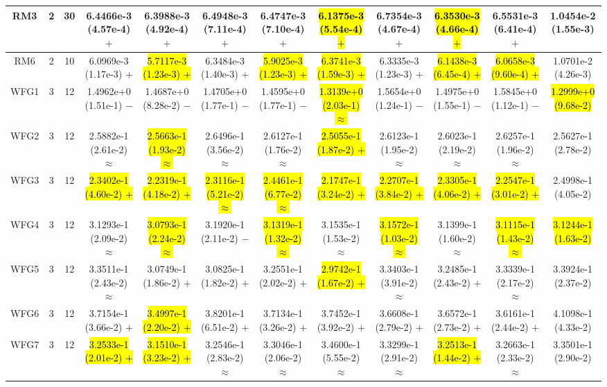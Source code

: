 \documentclass[journal]{IEEEtran}
\begin{document}
\begin{table*}[htbp]
\begin{tabular}{cccccccccccc}
\hline
\multirow{1}{*}{RM3}&2&30&6.4466e-3 (4.57e-4) $+$&6.3988e-3 (4.92e-4) $+$&6.4948e-3 (7.11e-4) $+$&6.4747e-3 (7.10e-4) $+$&\hl{6.1375e-3 (5.54e-4) $+$}&6.7354e-3 (4.67e-4) $+$&\hl{6.3530e-3 (4.66e-4) $+$}&6.5531e-3 (6.41e-4) $+$&1.0454e-2 (1.55e-3)\\
\hline
\multirow{1}{*}{RM6}&2&10&6.0969e-3 (1.17e-3) $+$&\hl{5.7117e-3 (1.23e-3) $+$}&6.3484e-3 (1.40e-3) $+$&\hl{5.9025e-3 (1.23e-3) $+$}&\hl{6.3741e-3 (1.59e-3) $+$}&6.3335e-3 (1.23e-3) $+$&\hl{6.1438e-3 (6.45e-4) $+$}&\hl{6.0658e-3 (9.60e-4) $+$}&1.0701e-2 (4.26e-3)\\
\hline
\multirow{1}{*}{WFG1}&3&12&1.4962e+0 (1.51e-1) $-$&1.4687e+0 (8.28e-2) $-$&1.4705e+0 (1.77e-1) $-$&1.4595e+0 (1.77e-1) $-$&\hl{1.3139e+0 (2.03e-1) $\approx$}&1.5654e+0 (1.24e-1) $-$&1.4975e+0 (1.55e-1) $-$&1.5845e+0 (1.12e-1) $-$&\hl{1.2999e+0 (9.68e-2)}\\
\hline
\multirow{1}{*}{WFG2}&3&12&2.5882e-1 (2.61e-2) $\approx$&\hl{2.5663e-1 (1.93e-2) $\approx$}&2.6496e-1 (3.56e-2) $\approx$&2.6127e-1 (1.76e-2) $\approx$&\hl{2.5055e-1 (1.87e-2) $+$}&2.6123e-1 (1.95e-2) $\approx$&2.6023e-1 (2.19e-2) $\approx$&2.6257e-1 (1.96e-2) $\approx$&2.5627e-1 (2.78e-2)\\
\hline
\multirow{1}{*}{WFG3}&3&12&\hl{2.3402e-1 (4.60e-2) $+$}&\hl{2.2319e-1 (4.18e-2) $+$}&\hl{2.3116e-1 (5.21e-2) $\approx$}&\hl{2.4461e-1 (6.77e-2) $\approx$}&\hl{2.1747e-1 (3.24e-2) $+$}&\hl{2.2707e-1 (3.84e-2) $+$}&\hl{2.3305e-1 (4.06e-2) $+$}&\hl{2.2547e-1 (3.01e-2) $+$}&2.4998e-1 (4.05e-2)\\
\hline
\multirow{1}{*}{WFG4}&3&12&3.1293e-1 (2.09e-2) $\approx$&\hl{3.0793e-1 (2.24e-2) $\approx$}&3.1920e-1 (2.11e-2) $-$&\hl{3.1319e-1 (1.32e-2) $\approx$}&3.1535e-1 (1.53e-2) $\approx$&\hl{3.1572e-1 (1.03e-2) $\approx$}&3.1399e-1 (1.60e-2) $\approx$&\hl{3.1115e-1 (1.43e-2) $\approx$}&\hl{3.1244e-1 (1.63e-2)}\\
\hline
\multirow{1}{*}{WFG5}&3&12&3.3511e-1 (2.43e-2) $\approx$&3.0749e-1 (1.86e-2) $+$&3.0825e-1 (1.82e-2) $+$&3.2551e-1 (2.02e-2) $+$&\hl{2.9742e-1 (1.67e-2) $+$}&3.3403e-1 (3.91e-2) $\approx$&3.2485e-1 (2.43e-2) $+$&3.3339e-1 (2.17e-2) $\approx$&3.3924e-1 (2.37e-2)\\
\hline
\multirow{1}{*}{WFG6}&3&12&3.7154e-1 (3.66e-2) $+$&\hl{3.4997e-1 (2.20e-2) $+$}&3.8201e-1 (6.51e-2) $+$&3.7134e-1 (3.26e-2) $+$&3.7452e-1 (3.92e-2) $+$&3.6608e-1 (2.79e-2) $+$&3.6572e-1 (2.73e-2) $+$&3.6161e-1 (2.44e-2) $+$&4.1098e-1 (4.33e-2)\\
\hline
\multirow{1}{*}{WFG7}&3&12&\hl{3.2533e-1 (2.01e-2) $+$}&\hl{3.1510e-1 (3.23e-2) $+$}&3.2546e-1 (2.83e-2) $\approx$&3.3046e-1 (2.06e-2) $\approx$&3.4600e-1 (5.55e-2) $\approx$&3.3299e-1 (2.91e-2) $\approx$&\hl{3.2513e-1 (1.44e-2) $+$}&3.2663e-1 (2.33e-2) $\approx$&3.3501e-1 (2.90e-2)\\

\end{tabular}
\end{table*}
\end{document}
